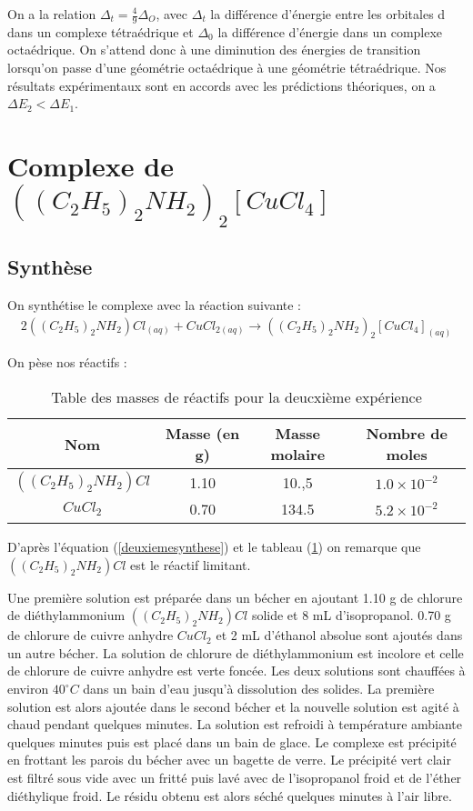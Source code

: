 \documentclass[12pt]{article}
\begin{document}
On a la relation $\Delta_t=\frac{4}{9}\Delta_O$, avec $\Delta_t$ la différence d'énergie entre les orbitales d dans un complexe tétraédrique et $\Delta_0$ la différence d'énergie dans un complexe octaédrique.
On s'attend donc à une diminution des énergies de transition lorsqu'on passe d'une géométrie octaédrique à une géométrie tétraédrique.
Nos résultats expérimentaux sont en accords avec les prédictions théoriques, on a $\Delta E_2 <  \Delta E_1$.

\section{Complexe  de$((C_2H_5)_2NH_2)_2[CuCl_4]$}
\subsection{Synthèse}
On synthétise le complexe avec la réaction suivante :
\begin{align}
    2((C_2H_5)_2NH_2)Cl_{(aq)} +  CuCl_{2(aq)} \longrightarrow ((C_2H_5)_2NH_2)_2[CuCl_4]_{(aq)}
\label{deuxiemesynthese}
\end{align}

On pèse nos réactifs :
\begin{table}[h!]
    \begin{center}
        \begin{tabular}{|c|c|c|c|}
            \hline
            Nom & Masse (en g) & Masse molaire & Nombre de moles \\
            \hline
            $((C_2H_5)_2NH_2)Cl$ & 1.10 & 10.,5 & $1.0\times 10^{-2}$ \\
            \hline
            $CuCl_2$ & 0.70 & 134.5 & $5.2 \times 10^{-2}$ \\
            \hline
        \end{tabular}
    \end{center}
    \caption{Table des masses de réactifs pour la deucxième expérience}
    \label{tab2:masse2}
\end{table}

D'après l'équation (\ref{deuxiemesynthese}) et le tableau (\ref{tab2:masse2}) on remarque que $((C_2H_5)_2NH_2)Cl$ est le réactif limitant.

Une première solution est préparée dans un bécher en ajoutant 1.10 g de chlorure de diéthylammonium $((C_2H_5)_2NH_2)Cl$ solide et 8 mL d'isopropanol.
0.70 g de chlorure de cuivre anhydre $CuCl_2$ et 2 mL d'éthanol absolue sont ajoutés dans un autre bécher. La solution de chlorure de diéthylammonium est incolore et celle de chlorure de cuivre anhydre est verte foncée.
Les deux solutions sont chauffées à environ $40 ^\circ C$ dans un bain d'eau jusqu'à dissolution des solides.
La première solution est alors ajoutée dans le second bécher et la nouvelle solution est agité à chaud pendant quelques minutes.
La solution est refroidi à température ambiante quelques minutes puis est placé dans un bain de glace.
Le complexe est précipité en frottant les parois du bécher avec un bagette de verre.
Le précipité vert clair est filtré sous vide avec un fritté puis lavé avec de l'isopropanol froid et de l'éther diéthylique froid.
Le résidu obtenu est alors séché quelques minutes à l'air libre. 
\end{document}
